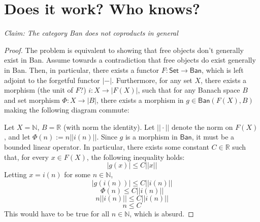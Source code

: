 \documentclass{article}
\newcommand{\R}{\mathbb{R}}
\newcommand{\N}{\mathbb{N}}
\begin{document}
\section{Does it work?  Who knows?}
	\textit{Claim:
		The category \textsf{Ban} does not coproducts in general}
\begin{proof}
	The problem is equivalent to showing that free objects don't generally exist in \textsf{Ban}.  Assume towards a contradiction that free objects do exist generally in \textsf{Ban}.  Then, in particular, there exists a functor $F: \textsf{Set}\rightarrow\textsf{Ban}$, which is left adjoint to the forgetful functor $|-|$.  Furthermore, for any set $X$, there exists a morphism (the unit of $F$?) $i: X\rightarrow |F(X)|$, such that for any Banach space $B$ and set morphism $\Phi: X\rightarrow|B|$, there exists a morphism in $g\in\textsf{Ban}(F(X),B)$ making the following diagram commute:
	\begin{center}
	\end{center}
Let $X=\N$, $B=\R$ (with norm the identity).  Let $||\cdot||$ denote the norm on $F(X)$, and let $\Phi(n) := n||i(n)||$.  Since $g$ is a morphism in $\textsf{Ban}$, it must be a bounded linear operator.  In particular, there exists some constant $C\in\R$ such that, for every $x\in F(X)$, the following inequality holds: $$|g(x)|\leq C||x||$$Letting $x=i(n)$ for some $n\in\N$, $$|g(i(n))|\leq C||i(n)||$$
$$\Phi(n)\leq C||i(n)||$$
$$n||i(n)||\leq C||i(n)||$$
$$n\leq C$$This would have to be true for all $n\in\N$, which is absurd.
\end{proof}
\end{document}
